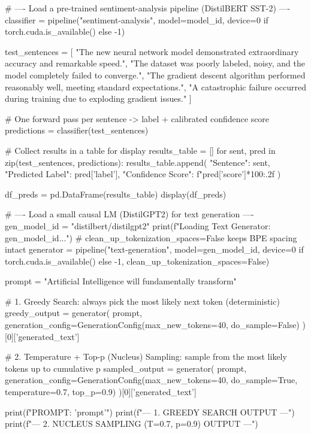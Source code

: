 \begin{codebox}[title={Load a pre-trained sentiment-analysis pipeline (DistilBERT SST-2)}]
# ---- Load a pre-trained sentiment-analysis pipeline (DistilBERT SST-2) ----
classifier = pipeline("sentiment-analysis", model=model_id, device=0 if torch.cuda.is_available() else -1)

test_sentences = [
    "The new neural network model demonstrated extraordinary accuracy and remarkable speed.",
    "The dataset was poorly labeled, noisy, and the model completely failed to converge.",
    "The gradient descent algorithm performed reasonably well, meeting standard expectations.",
    "A catastrophic failure occurred during training due to exploding gradient issues."
]

# One forward pass per sentence -> label + calibrated confidence score
predictions = classifier(test_sentences)

# Collect results in a table for display
results_table = []
for sent, pred in zip(test_sentences, predictions):
    results_table.append({
        "Sentence": sent,
        "Predicted Label": pred['label'],
        "Confidence Score": f"{pred['score']*100:.2f}%
    })

df_preds = pd.DataFrame(results_table)
display(df_preds)
\end{codebox}

\begin{codebox}[title={Load a small causal LM (DistilGPT2) for text generation}]
# ---- Load a small causal LM (DistilGPT2) for text generation ----
gen_model_id = "distilbert/distilgpt2"
print(f"Loading Text Generator: {gen_model_id}...")
# clean_up_tokenization_spaces=False keeps BPE spacing intact
generator = pipeline("text-generation", model=gen_model_id,
                     device=0 if torch.cuda.is_available() else -1, clean_up_tokenization_spaces=False)

prompt = "Artificial Intelligence will fundamentally transform"

# 1. Greedy Search: always pick the most likely next token (deterministic)
greedy_output = generator(
    prompt, generation_config=GenerationConfig(max_new_tokens=40, do_sample=False)
)[0]['generated_text']

# 2. Temperature + Top-p (Nucleus) Sampling: sample from the most likely tokens up to cumulative p
sampled_output = generator(
    prompt, generation_config=GenerationConfig(max_new_tokens=40, do_sample=True, temperature=0.7, top_p=0.9)
)[0]['generated_text']

print(f"PROMPT: '{prompt}'\n")
print(f"--- 1. GREEDY SEARCH OUTPUT ---\n")
print(f"--- 2. NUCLEUS SAMPLING (T=0.7, p=0.9) OUTPUT ---")
\end{codebox}

